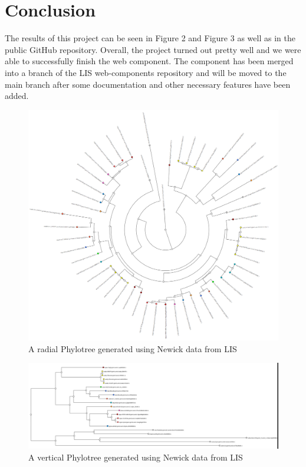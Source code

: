 \documentclass[twoside,twocolumn]{article}
\begin{document}
   
    \section{Conclusion}
    The results of this project can be seen in Figure 2 and Figure 3 as well as in the public GitHub repository. Overall, the project turned out pretty well and we were able to successfully finish the web component.  The component has been merged into a branch of the LIS web-components repository and will be moved to the main branch after some documentation and other necessary features have been added.
      \begin{figure}
        \centering
        \includegraphics[width=1\linewidth]{imgs/radial-color.png}
        \caption{A radial Phylotree generated using Newick data from LIS}
    \end{figure}
     \begin{figure}
        \centering
        \includegraphics[width=1\linewidth]{imgs/vertical-lis-tree.png}
        \caption{A vertical Phylotree generated using Newick data from LIS}
    \end{figure}
\end{document}
